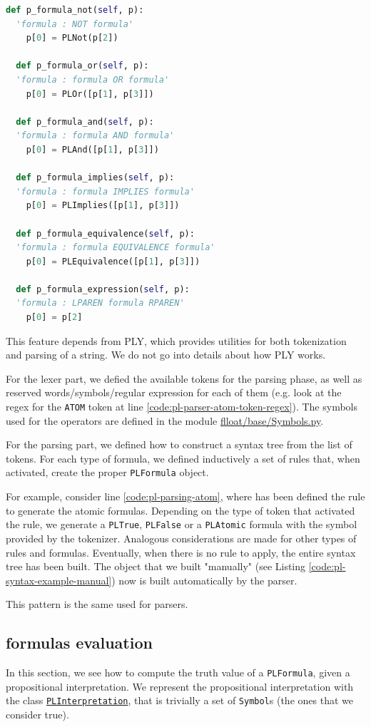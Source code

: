 \begin{lstlisting}[language=Python, style=Python, escapechar = £, label={code:PLLexer-PLParser}, caption={\texttt{PLLexer} and \texttt{PLParser}}]
  def p_formula_not(self, p):
  'formula : NOT formula'
    p[0] = PLNot(p[2])

  def p_formula_or(self, p):
  'formula : formula OR formula'
    p[0] = PLOr([p[1], p[3]])

  def p_formula_and(self, p):
  'formula : formula AND formula'
    p[0] = PLAnd([p[1], p[3]])

  def p_formula_implies(self, p):
  'formula : formula IMPLIES formula'
    p[0] = PLImplies([p[1], p[3]])

  def p_formula_equivalence(self, p):
  'formula : formula EQUIVALENCE formula'
    p[0] = PLEquivalence([p[1], p[3]])

  def p_formula_expression(self, p):
  'formula : LPAREN formula RPAREN'
    p[0] = p[2]
\end{lstlisting}
This feature depends from PLY, which provides utilities for both tokenization and parsing of a string. We do not go into details about how PLY works. 

For the lexer part, we defied the available tokens for the parsing phase, as well as reserved words/symbols/regular expression for each of them (e.g. look at the regex for the \texttt{ATOM} token at line \ref{code:pl-parser-atom-token-regex}). The symbols used for the operators are defined in the module \href{https://github.com/MarcoFavorito/flloat/blob/0.1.4/flloat/base/Symbols.py}{flloat/base/Symbols.py}.

For the parsing part, we defined how to construct a syntax tree from the list of tokens. For each type of formula, we defined inductively a set of rules that, when activated, create the proper \texttt{PLFormula} object.

For example, consider line \ref{code:pl-parsing-atom}, where has been defined the rule to generate the atomic formulas. Depending on the type of token that activated the rule, we generate a \texttt{PLTrue}, \texttt{PLFalse} or a \texttt{PLAtomic} formula with the symbol provided by the tokenizer. Analogous considerations are made for other types of rules and formulas.
Eventually, when there is no rule to apply, the entire syntax tree has been built. The object that we built "manually" (see Listing \ref{code:pl-syntax-example-manual}) now is built automatically by the parser.

This pattern is the same used for \LLf parsers.

\subsection{\PL formulas evaluation}\label{sect:flloat-pl-semantics}
In this section, we see how to compute the truth value of a  \texttt{PLFormula}, given a propositional interpretation. 
We represent the propositional interpretation with the class \href{https://github.com/MarcoFavorito/flloat/blob/0.1.4/flloat/semantics/pl.py#L8-L28}{\texttt{PLInterpretation}}, that is trivially a set of \texttt{Symbol}s (the ones that we consider true).


